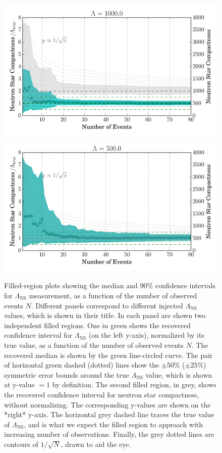 \documentclass[aps,prd,amsmath,floats,floatfix, twocolumn,
superscriptaddress,nofootinbib,showpacs]{revtex4-1}
\newcommand{\lambdans}{\Lambda_\mathrm{NS}}
\begin{document}
\begin{figure}
\includegraphics[width=1.\columnwidth]{plots/FillBetweenNormErrorBarsLambda_vs_N_L1000.pdf}
\includegraphics[width=1.\columnwidth]{plots/FillBetweenNormErrorBarsLambda_vs_N_L500.pdf}
\caption{Filled-region plots showing the median and $90\%$ confidence intervals
for $\lambdans$ measurement, as a function of the number of observed events $N$.
Different panels correspond to different injected $\lambdans$ values, which is shown
in their title. In each panel are shown two independent filled regions. 
%  
 One in green shows the recovered confidence interval
 for $\lambdans$ (on the left y-axis), normalized by its true value,
 as a function of the 
 number of observed events $N$. The recovered median is shown by the
 green line-circled curve. The pair of horizontal green dashed (dotted)
 lines show the $\pm 50\%$ ($\pm 25\%$) symmetric error bounds around
 the true $\lambdans$ value, which is shown at y-value $=1$ by definition.
% 
 The second filled region, in grey, shows the recovered
 confidence interval for neutron star compactness, without normalizing.
 The corresponding y-values are shown on the *right* y-axis. The horizontal grey
 dashed line traces the true value of $\lambdans$, and is what we expect
 the filled region to approach with increasing number of observations.
%  
 Finally, the grey dotted lines are contours of $1/\sqrt{N}$, drawn to aid the eye.
}
\label{fig:TT_Lambda_vs_N_L500_2000_CI90_0}
\end{figure}
\end{document}
